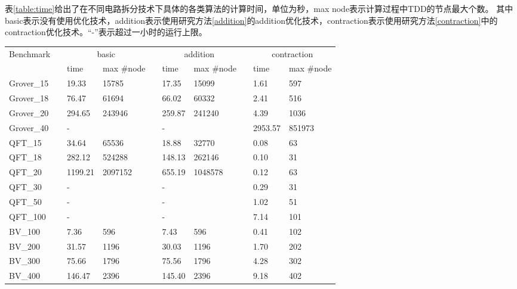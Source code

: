 表\ref{table:time}给出了在不同电路拆分技术下具体的各类算法的计算时间，单位为秒，max node表示计算过程中TDD的节点最大个数。
其中basic表示没有使用优化技术，addition表示使用研究方法\ref{addition}的addition优化技术，contraction表示使用研究方法\ref{contraction}中的contraction优化技术。“-”表示超过一小时的运行上限。
\begin{table}[!htbp]
    \centering
    \begin{tabular}{llllllllll}
        \hline
        \multirow{2}{*}{Benchmark} &  & \multicolumn{2}{c}{basic} &  & \multicolumn{2}{c}{addition} &  & \multicolumn{2}{c}{contraction} \\ \cline{3-4} \cline{6-7} \cline{9-10} 
                                   &  & time        & max \#node       &  & time          & max \#node        &  & time           & max \#node          \\ \hline
        Grover\_15 &   & 19.33  & 15785     &   & 17.35      & 15099  & & 1.61 & 597  \\
        Grover\_18 &   & 76.47  & 61694     &   & 66.02      & 60332  & & 2.41 & 516  \\
        Grover\_20 &   & 294.65 & 243946    &   & 259.87     & 241240 & & 4.39  & 1036 \\ 
        Grover\_40 &   & -      &           &   & -          &        & & 2953.57 & 851973 \\
        \hline
        QFT\_15     &  & 34.64   & 65536   &  & 18.88  & 32770   &  & 0.08 & 63  \\
        QFT\_18     &  & 282.12  & 524288  &  & 148.13 & 262146 &   & 0.10  & 31  \\
        QFT\_20     &  & 1199.21 & 2097152 &  & 655.19 & 1048578 &  & 0.12 & 63  \\
        QFT\_30     &  & -       &         &  & -      &        &  & 0.29 & 31  \\
        QFT\_50     &  & -       &         &  & -      &        &  & 1.02 & 51  \\
        QFT\_100    &  & -       &         &  & -      &        &  & 7.14 & 101 \\
        \hline
        BV\_100     &  & 7.36    & 596     &  & 7.43      & 596     &  & 0.41           & 102 \\
        BV\_200     &  & 31.57   & 1196    &  & 30.03     & 1196    &  & 1.70           & 202 \\
        BV\_300     &  & 75.66   & 1796    &  & 75.56     & 1796    &  & 4.28           & 302 \\
        BV\_400     &  & 146.47  & 2396    &  & 145.40    & 2396    &  & 9.18           & 402 \\

\end{tabular}
\end{table}
